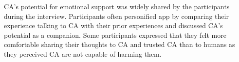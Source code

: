             




        
            \ac{CA}'s potential for emotional support was widely shared by the participants during the interview. Participants often personified \acl{app} by comparing their experience talking to \ac{CA} with their prior experiences and discussed \ac{CA}'s potential as a companion. 
            Some participants expressed that they felt more comfortable sharing their thoughts to \ac{CA} and trusted \ac{CA} than to humans as they perceived \ac{CA} are not capable of harming them.

